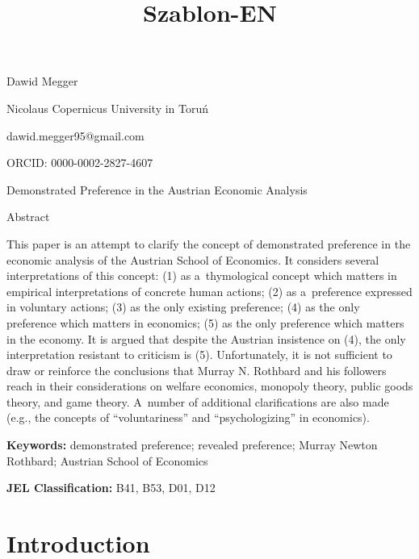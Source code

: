 \setcounter{secnumdepth}{2}



\title{Szablon-EN}



Dawid Megger



Nicolaus Copernicus University in Toruń



dawid.megger95@gmail.com



ORCID: 0000-0002-2827-4607



Demonstrated Preference in the Austrian Economic Analysis





Abstract



This paper is an attempt to clarify the concept of demonstrated preference in the economic analysis of the Austrian School of Economics. It considers several interpretations of this concept: (1) as a~thymological concept which matters in empirical interpretations of concrete human actions; (2) as a~preference expressed in voluntary actions; (3) as the only existing preference; (4) as the only preference which matters in economics; (5) as the only preference which matters in the economy. It is argued that despite the Austrian insistence on (4), the only interpretation resistant to criticism is (5). Unfortunately, it is not sufficient to draw or reinforce the conclusions that Murray N. Rothbard and his followers reach in their considerations on welfare economics, monopoly theory, public goods theory, and game theory. A~number of additional clarifications are also made (e.g., the concepts of ``voluntariness'' and ``psychologizing'' in economics).



\textbf{Keywords:} demonstrated preference; revealed preference; Murray Newton Rothbard; Austrian School of Economics



\textbf{JEL Classification:} B41, B53, D01, D12



\section{Introduction}

